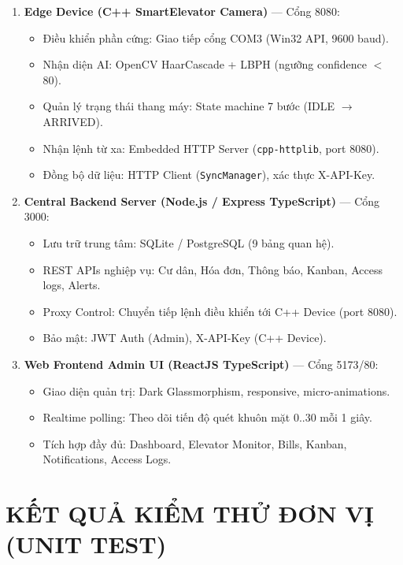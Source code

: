 \documentclass[12pt,a4paper]{article}
\begin{document}
\begin{enumerate}
    \item \textbf{Edge Device (C++ SmartElevator Camera)} — Cổng 8080:
    \begin{itemize}
        \item Điều khiển phần cứng: Giao tiếp cổng COM3 (Win32 API, 9600 baud).
        \item Nhận diện AI: OpenCV HaarCascade + LBPH (ngưỡng confidence $<$ 80).
        \item Quản lý trạng thái thang máy: State machine 7 bước (IDLE $\rightarrow$ ARRIVED).
        \item Nhận lệnh từ xa: Embedded HTTP Server (\texttt{cpp-httplib}, port 8080).
        \item Đồng bộ dữ liệu: HTTP Client (\texttt{SyncManager}), xác thực X-API-Key.
    \end{itemize}
    \item \textbf{Central Backend Server (Node.js / Express TypeScript)} — Cổng 3000:
    \begin{itemize}
        \item Lưu trữ trung tâm: SQLite / PostgreSQL (9 bảng quan hệ).
        \item REST APIs nghiệp vụ: Cư dân, Hóa đơn, Thông báo, Kanban, Access logs, Alerts.
        \item Proxy Control: Chuyển tiếp lệnh điều khiển tới C++ Device (port 8080).
        \item Bảo mật: JWT Auth (Admin), X-API-Key (C++ Device).
    \end{itemize}
    \item \textbf{Web Frontend Admin UI (ReactJS TypeScript)} — Cổng 5173/80:
    \begin{itemize}
        \item Giao diện quản trị: Dark Glassmorphism, responsive, micro-animations.
        \item Realtime polling: Theo dõi tiến độ quét khuôn mặt 0..30 mỗi 1 giây.
        \item Tích hợp đầy đủ: Dashboard, Elevator Monitor, Bills, Kanban, Notifications, Access Logs.
    \end{itemize}
\end{enumerate}

\newpage

\section{KẾT QUẢ KIỂM THỬ ĐƠN VỊ (UNIT TEST)}
\end{document}

